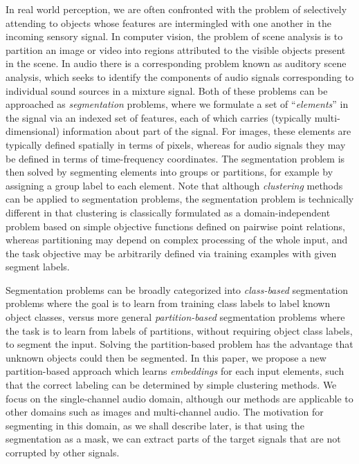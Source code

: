 \documentclass[9pt]{article} \usepackage{nips15submit_e,times}
\begin{document}
In real world perception, we are often confronted with the problem of selectively attending to objects whose features are intermingled with one another in the incoming sensory signal.   In computer vision, the problem of scene analysis is to partition an image or video into regions attributed to the visible objects present in the scene.   In audio there is a corresponding problem known as auditory scene analysis\cite{bregman1994auditory,Darwin95}, which seeks to identify the components of audio signals corresponding to individual sound sources in a mixture signal.   Both of these problems can be approached as \emph{segmentation} problems, where we formulate a set of ``\emph{elements}'' in the signal via an indexed set of features, each of which carries (typically multi-dimensional) information about part of the signal.  For images, these elements are typically defined spatially in terms of pixels, whereas for audio signals they may be defined in terms of time-frequency coordinates.    The segmentation problem is then solved by segmenting elements into groups or partitions, for example by assigning a group label to each element.  Note that although \emph{clustering} methods can be applied to segmentation problems, the segmentation problem is technically different in that clustering is classically formulated as a domain-independent problem based on simple objective functions defined on pairwise point relations, whereas partitioning may depend on complex processing of the whole input, and the task objective may be arbitrarily defined via training examples with given segment labels.  

Segmentation problems can be broadly categorized into \emph{class-based} segmentation problems where the goal is to learn from training class labels to label known object classes, versus more general \emph{partition-based} segmentation problems where the task is to learn from labels of partitions, without requiring object class labels, to segment the input.   Solving the partition-based problem has the advantage that unknown objects could then be segmented.  In this paper, we propose a new partition-based approach which learns \emph{embeddings} for each input elements, such that the correct labeling can be determined by simple clustering methods.   We focus on the single-channel audio domain, although our methods are applicable to other domains such as images and multi-channel audio.  The motivation for segmenting in this domain, as we shall describe later, is that using the segmentation as a mask, we can extract parts of the target signals that are not corrupted by other signals. 
\end{document}
